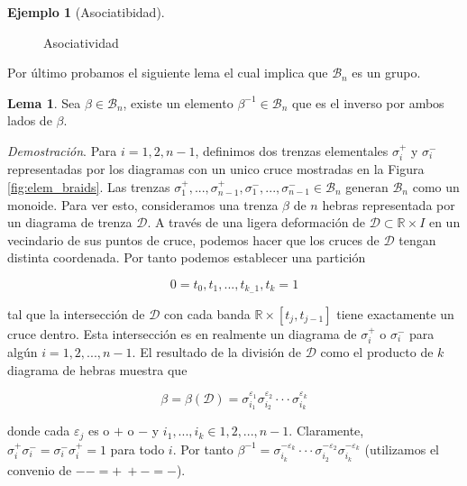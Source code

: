 \documentclass[12pt]{article}
\theoremstyle{definition}
\newtheorem{ejem}{Ejemplo}[section]
\newtheorem{lema}{Lema}[section]
\begin{document}
\begin{ejem}[Asociatibidad]
\begin{figure}[h!]
\begin{subfigure}[b]{0.45\linewidth}
\begin{center}
		\end{center}
		\caption{}
	\end{subfigure}
	\caption{Asociatividad}
	\label{fig:asoci}
\end{figure}

\label{ejem:asoci}

\end{ejem}

Por último probamos el siguiente lema el cual implica que $\mathcal{B}_n$ es un grupo.

\begin{lema}
\label{lema:inverso}
Sea $\beta\in\mathcal{B}_n$, existe un elemento $\beta^{-1}\in\mathcal{B}_n$ que es el inverso por ambos lados de $\beta$.
\end{lema}
\textit{Demostración}. Para $i = 1,2,n-1$, definimos dos trenzas elementales $\sigma_i^+$ y $\sigma_i^-$ representadas por los diagramas con un unico cruce mostradas en la Figura \ref{fig:elem_braids}. Las trenzas $\sigma_1^+,...,\sigma_{n-1}^+, \sigma_1^-,...,\sigma_{n-1}^-\in\mathcal{B}_n$ generan $\mathcal{B}_n$ como un monoide. Para ver esto, consideramos una trenza $\beta$ de $n$ hebras representada por un diagrama de trenza $\mathcal{D}$. A través de una ligera deformación de $\mathcal{D}\subset\mathbb{R}\times I$ en un vecindario de sus puntos de cruce, podemos hacer que los cruces de $\mathcal{D}$ tengan distinta coordenada. Por tanto podemos establecer una partición

$$0=t_0,t_1,...,t_{k_-1},t_k = 1$$

tal que la intersección de $\mathcal{D}$ con cada banda $\mathbb{R}\times[t_j, t_{j-1}]$ tiene exactamente un cruce dentro. Esta intersección es en realmente un diagrama de $\sigma_i^+$ o $\sigma_i^-$ para algún $i = 1,2,...,n-1$. El resultado de la división de $\mathcal{D}$ como el producto de $k$ diagrama de hebras muestra que

$$\beta = \beta(\mathcal{D}) = \sigma_{i_1}^{\varepsilon_1}\sigma_{i_2}^{\varepsilon_2}\cdot\cdot\cdot\sigma_{i_k}^{\varepsilon_k}$$

donde cada $\varepsilon_j$ es o $+$ o $-$ y $i_1,...,i_k\in{1,2,...,n-1}$.
Claramente, $\sigma_i^+\sigma_i^- = \sigma_i^-\sigma_i^+=1$ para todo $i$. Por tanto $\beta^{-1} = \sigma_{i_k}^{-\varepsilon_k}\cdot\cdot\cdot\sigma_{i_2}^{-\varepsilon_2}\sigma_{i_k}^{-\varepsilon_k}$ (utilizamos el convenio de $--=+\ +-=-$).
\end{document}
